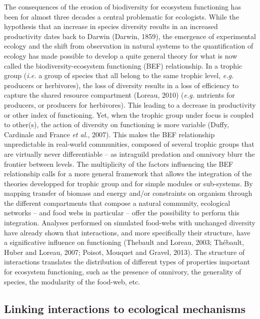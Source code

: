 \documentclass[12pt]{article}
\begin{document}
The consequences of the erosion of biodiversity for ecosystem
functioning has been for almost three decades a central problematic for
ecologists. While the hypothesis that an increase in species diversity
results in an increased productivity dates back to Darwin (Darwin,
1859), the emergence of experimental ecology and the shift from
observation in natural systems to the quantification of ecology has made
possible to develop a quite general theory for what is now called the
biodiversity-ecosystem functioning (BEF) relationship. In a trophic
group (\emph{i.e.} a group of species that all belong to the same
trophic level, \emph{e.g.} producers or herbivores), the loss of
diversity results in a loss of efficiency to capture the shared resource
compartment (Loreau, 2010) (\emph{e.g.} nutrients for producers, or
producers for herbivores). This leading to a decrease in productivity or
other index of functioning. Yet, when the trophic group under focus is
coupled to other(s), the action of diversity on functioning is more
variable (Duffy, Cardinale and France \emph{et al.}, 2007). This makes
the BEF relationship unpredictable in real-world communities, composed
of several trophic groups that are virtually never differentiable -- as
intraguild predation and omnivory blurr the frontier between levels. The
multiplicity of the factors influencing the BEF relationship calls for a
more general framework that allows the integration of the theories
developped for trophic group and for simple modules or sub-systems. By
mapping transfer of biomass and energy and/or constraints on organism
through the different compartments that compose a natural community,
ecological networks -- and food webs in particular -- offer the
possibility to perform this integration. Analyses performed on simulated
food-webs with unchanged diversity have already shown that interactions,
and more specifically their structure, have a significative influence on
functioning (Thebault and Loreau, 2003; Thébault, Huber and Loreau,
2007; Poisot, Mouquet and Gravel, 2013). The structure of interactions
translates the distribution of different types of properties important
for ecosystem functioning, such as the presence of omnivory, the
generality of species, the modularity of the food-web, etc.

\subsection{Linking interactions to ecological
mechanisms}\label{linking-interactions-to-ecological-mechanisms}
\end{document}

